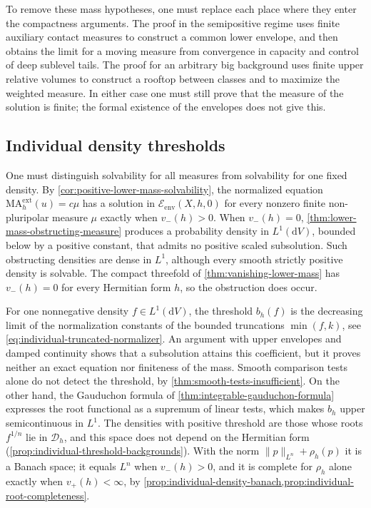 To remove these mass hypotheses, one must replace each place where they enter the compactness arguments. The proof in the semipositive regime uses finite auxiliary contact measures to construct a common lower envelope, and then obtains the limit for a moving measure from convergence in capacity and control of deep sublevel tails. The proof for an arbitrary big background uses finite upper relative volumes to construct a rooftop between classes and to maximize the weighted measure. In either case one must still prove that the measure of the solution is finite; the formal existence of the envelopes does not give this.

\subsection{Individual density thresholds}

One must distinguish solvability for all measures from solvability for one fixed density. By \cref{cor:positive-lower-mass-solvability}, the normalized equation $\mathrm{MA}^{\mathrm{ext}}_h(u)=c\mu$ has a solution in $\mathcal E_{\mathrm{env}}(X,h,0)$ for every nonzero finite non-pluripolar measure $\mu$ exactly when $v_-(h)>0$. When $v_-(h)=0$, \cref{thm:lower-mass-obstructing-measure} produces a probability density in $L^1(\mathrm{d}V)$, bounded below by a positive constant, that admits no positive scaled subsolution. Such obstructing densities are dense in $L^1$, although every smooth strictly positive density is solvable. The compact threefold of \cref{thm:vanishing-lower-mass} has $v_-(h)=0$ for every Hermitian form $h$, so the obstruction does occur.

For one nonnegative density $f\in L^1(\mathrm{d}V)$, the threshold $b_h(f)$ is the decreasing limit of the normalization constants of the bounded truncations $\min(f,k)$, see \eqref{eq:individual-truncated-normalizer}. An argument with upper envelopes and damped continuity shows that a subsolution attains this coefficient, but it proves neither an exact equation nor finiteness of the mass. Smooth comparison tests alone do not detect the threshold, by \cref{thm:smooth-tests-insufficient}. On the other hand, the Gauduchon formula of \cref{thm:integrable-gauduchon-formula} expresses the root functional as a supremum of linear tests, which makes $b_h$ upper semicontinuous in $L^1$. The densities with positive threshold are those whose roots $f^{1/n}$ lie in $\mathcal D_h$, and this space does not depend on the Hermitian form (\cref{prop:individual-threshold-backgrounds}). With the norm $\|p\|_{L^n}+\rho_h(p)$ it is a Banach space; it equals $L^n$ when $v_-(h)>0$, and it is complete for $\rho_h$ alone exactly when $v_+(h)<\infty$, by \cref{prop:individual-density-banach,prop:individual-root-completeness}.

